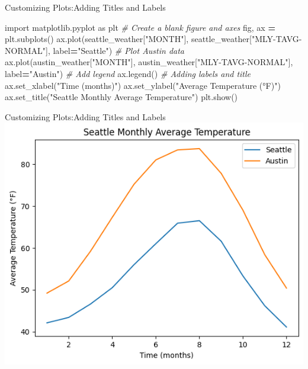 \documentclass[
  ignorenonframetext,
]{beamer}
\newenvironment{Shaded}{\begin{snugshade}}{\end{snugshade}}
\newcommand{\CommentTok}[1]{\textcolor[rgb]{0.56,0.35,0.01}{\textit{#1}}}
\newcommand{\ImportTok}[1]{#1}
\newcommand{\NormalTok}[1]{#1}
\newcommand{\OperatorTok}[1]{\textcolor[rgb]{0.81,0.36,0.00}{\textbf{#1}}}
\newcommand{\StringTok}[1]{\textcolor[rgb]{0.31,0.60,0.02}{#1}}
\begin{document}
\begin{frame}[fragile]{Customizing Plots:Adding Titles and Labels}
\label{customizing-plotsadding-titles-and-labels-2}

\begin{Shaded}
\begin{Highlighting}[]
\ImportTok{import}\NormalTok{ matplotlib.pyplot }\ImportTok{as}\NormalTok{ plt}
\CommentTok{\# Create a blank figure and axes}
\NormalTok{fig, ax }\OperatorTok{=}\NormalTok{ plt.subplots()}
\NormalTok{ax.plot(seattle\_weather[}\StringTok{"MONTH"}\NormalTok{], seattle\_weather[}\StringTok{"MLY{-}TAVG{-}NORMAL"}\NormalTok{], label}\OperatorTok{=}\StringTok{"Seattle"}\NormalTok{)}
\CommentTok{\# Plot Austin data}
\NormalTok{ax.plot(austin\_weather[}\StringTok{"MONTH"}\NormalTok{], austin\_weather[}\StringTok{"MLY{-}TAVG{-}NORMAL"}\NormalTok{], label}\OperatorTok{=}\StringTok{"Austin"}\NormalTok{)}
\CommentTok{\# Add legend}
\NormalTok{ax.legend()}
\CommentTok{\# Adding labels and title}
\NormalTok{ax.set\_xlabel(}\StringTok{"Time (months)"}\NormalTok{)}
\NormalTok{ax.set\_ylabel(}\StringTok{"Average Temperature (°F)"}\NormalTok{)}
\NormalTok{ax.set\_title(}\StringTok{"Seattle Monthly Average Temperature"}\NormalTok{)}
\NormalTok{plt.show()}
\end{Highlighting}
\end{Shaded}
\end{frame}

\begin{frame}{Customizing Plots:Adding Titles and Labels}
\label{customizing-plotsadding-titles-and-labels-3}
\includegraphics{../images/im228.png}
\end{frame}
\end{document}
